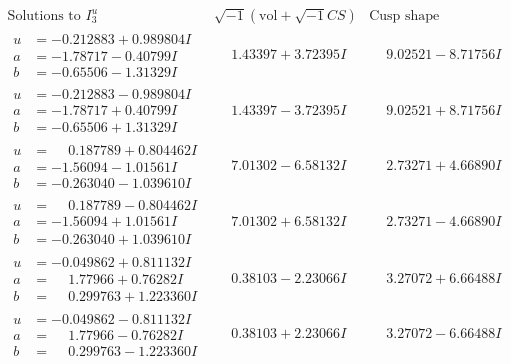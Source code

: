 \documentclass[1p]{elsarticle_modified}
\theoremstyle{definition}
\newcommand{\I}{\sqrt{-1}}
\begin{document}
$$\begin{array}{c|c|c}  
\text{Solutions to }I^u_{3}& \I (\text{vol} + \sqrt{-1}CS) & \text{Cusp shape}\\
 \hline 
\begin{aligned}
u &= -0.212883 + 0.989804 I \\
a &= -1.78717 - 0.40799 I \\
b &= -0.65506 - 1.31329 I\end{aligned}
 & \phantom{-}1.43397 + 3.72395 I & \phantom{-}9.02521 - 8.71756 I \\ \hline\begin{aligned}
u &= -0.212883 - 0.989804 I \\
a &= -1.78717 + 0.40799 I \\
b &= -0.65506 + 1.31329 I\end{aligned}
 & \phantom{-}1.43397 - 3.72395 I & \phantom{-}9.02521 + 8.71756 I \\ \hline\begin{aligned}
u &= \phantom{-}0.187789 + 0.804462 I \\
a &= -1.56094 - 1.01561 I \\
b &= -0.263040 - 1.039610 I\end{aligned}
 & \phantom{-}7.01302 - 6.58132 I & \phantom{-}2.73271 + 4.66890 I \\ \hline\begin{aligned}
u &= \phantom{-}0.187789 - 0.804462 I \\
a &= -1.56094 + 1.01561 I \\
b &= -0.263040 + 1.039610 I\end{aligned}
 & \phantom{-}7.01302 + 6.58132 I & \phantom{-}2.73271 - 4.66890 I \\ \hline\begin{aligned}
u &= -0.049862 + 0.811132 I \\
a &= \phantom{-}1.77966 + 0.76282 I \\
b &= \phantom{-}0.299763 + 1.223360 I\end{aligned}
 & \phantom{-}0.38103 - 2.23066 I & \phantom{-}3.27072 + 6.66488 I \\ \hline\begin{aligned}
u &= -0.049862 - 0.811132 I \\
a &= \phantom{-}1.77966 - 0.76282 I \\
b &= \phantom{-}0.299763 - 1.223360 I\end{aligned}
 & \phantom{-}0.38103 + 2.23066 I & \phantom{-}3.27072 - 6.66488 I \\ \hline\begin{aligned}

\end{aligned}
\end{array}$$
\end{document}
